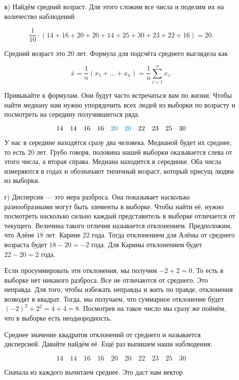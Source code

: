 \documentclass[12pt, a4paper, oneside]{article}
\begin{document}
\begin{enumerate}
	\item[в)]  Найдём средний возраст. Для этого сложим все числа и поделим их на количество наблюдений
	
	\[
	\frac{1}{10} \cdot (14 + 16 + 20 + 20 + 14 + 25 + 30 + 23 + 22 + 16) = 20.
	\]
	
	Средний возраст это $20$ лет.  Формула для подсчёта среднего выглядела как 
	
	\[
	\bar x = \frac{1}{n} (x_1 + \ldots + x_n) = \frac{1}{n} \sum_{i=1}^n x_i.
	\]
	
	Привыкайте к формулам. Они будут часто встречаться вам по жизни.  Чтобы найти медиану нам нужно упорядочить всех людей из выборки по возрасту и посмотреть на середину получившегося ряда. 
	
	\[
	14 \quad 14  \quad 16  \quad 16  \quad {\color{myblue}{20}}  \quad {\color{myblue}{20}}  \quad 22  \quad 23  \quad 25  \quad 30
	\]
	
	У нас в середине находятся сразу два человека. Медианой будет их среднее, то есть $20$ лет. Грубо говоря, половина нашей выборки оказывается слева от этого числа, а вторая справа. Медиана находится в серединке.  Оба числа измеряются в годах и обозначают типичный возраст, который присущ людям из выборки. 
	

	\item[г)]  Дисперсия --- это мера разброса. Она показывает насколько разнообразными могут быть элементы в выборке. Чтобы найти её, нужно посмотреть насколько сильно каждый представитель в выборке отличается от текущего. Величина такого отличия называется отклонением. Предположим, что Алёне $18$ лет. Карине $22$ года. Тогда отклонением для Алёны от среднего возраста будет $18 - 20 = -2$ года. Для Карины отклонением будет $22 - 20 = 2$ года. 
	
	Если просуммировать эти отклонения, мы получим $-2 + 2 = 0$. То есть в выборке нет никакого разброса. Все не отличаются от среднего. Это неправда. Для того, чтобы избежать неправды и жить по правде, отклонения возводят в квадрат. Тогда, мы получаем, что суммарное отклонение будет $(-2)^2 + 2^2 = 4 + 4 = 8$. Посмотрев на такое число мы сразу же поймём, что в выборке есть неоднородность. 
	
	Среднее значение квадратов отклонений от среднего и называется дисперсией. Давайте найдём её. Ещё раз выпишем наши наблюдения: 
	
	\[
	14 \quad 14  \quad 16  \quad 16  \quad 20  \quad 20  \quad 22  \quad 23  \quad 25  \quad 30
	\]
	
	Сначала из каждого вычитаем среднее. Это даст нам вектор 
	

\end{enumerate}
\end{document}

